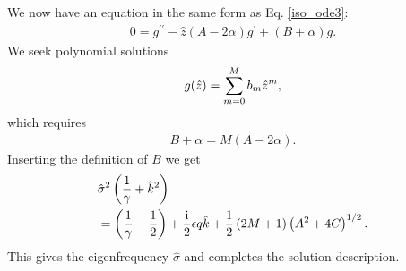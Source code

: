 We now have an equation in the same form as Eq. \ref{iso_ode3}:
\begin{align}
  0 = g^{\prime\prime} - \hat{z}\left(A - 2\alpha\right)g^\prime +
  \left(B + \alpha\right)g.
\end{align}
We seek polynomial solutions 
\begin{align}
  g(\hat{z}) = \sum_{m=0}^M b_m \hat{z}^m,
\end{align}
which requires
\begin{align}
  B + \alpha = M\left(A-2\alpha\right).
\end{align}
Inserting the definition of $B$ we get
\begin{align}
  &\hat{\sigma}^2\left(\frac{1}{\gamma}+\hat{k}^2\right) \notag\\ &=
  \left(\frac{1}{\gamma}-\frac{1}{2}\right) +\frac{\mathrm{i}}{2}\epsilon q
  \hat{k} + \frac{1}{2}\left(2M+1\right)\left(A^2 + 4C\right)^{1/2}\label{adia_disp}. 
\end{align}
This gives the eigenfrequency $\hat{\sigma}$ and completes the solution
description.  


